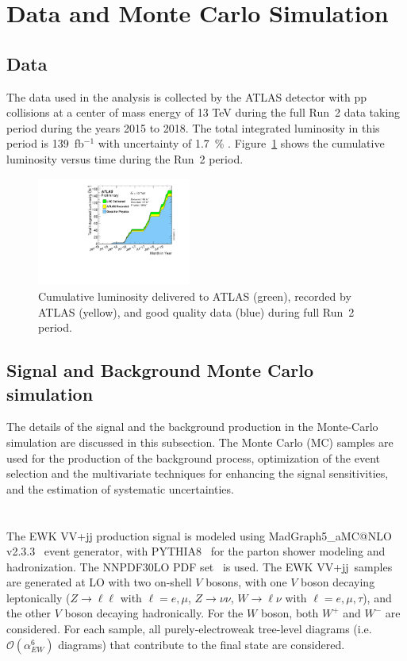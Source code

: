 \section{Data and Monte Carlo Simulation}
\subsection{Data}
The data used in the analysis is collected by the ATLAS detector with pp collisions at a center of mass energy of 13 TeV during the full Run~2 data taking period during the years 2015 to 2018. The total integrated luminosity in this period is 139~fb$^{-1}$ with uncertainty of 1.7~\% \cite{DAPR-2010-01}. Figure~\ref{fig:luminosity} shows the cumulative luminosity versus time during the Run~2 period.

\begin{figure}[H]
\begin{center}
 \includegraphics[width=0.45\textwidth,keepaspectratio]{figures/intlumivstimeRun2DQall.pdf}
\caption[f]{
Cumulative luminosity delivered to ATLAS (green), recorded by ATLAS (yellow), and good quality data (blue) during full Run~2 period.
}
\label{fig:luminosity}
\end{center}
\end{figure}

\subsection{Signal and Background Monte Carlo simulation}
\label{subsec:sigbgMC}
The details of the signal and the background production in the Monte-Carlo simulation are discussed in this subsection.
The Monte Carlo (MC) samples are used for the production of the background process, optimization of the event selection and the multivariate techniques for enhancing the signal sensitivities, and the estimation of systematic uncertainties.
\\ \\
\noindent\textbf{} \\ 
The EWK VV+jj production signal is modeled using MadGraph5\_aMC@NLO v2.3.3~\cite{Alwall:2014hca} event generator, with PYTHIA8~\cite{Sjostrand:2007gs} for the parton shower modeling and hadronization. The \textsc{NNPDF30LO} PDF set~\cite{Ball:2012cx} is used. 
The EWK VV+jj\ samples are generated at LO with two on-shell $V$ bosons, with one $V$ boson decaying leptonically
($Z\to \ell\ell$ with $\ell = e, \mu$, $Z\to \nu\nu$, $W\to \ell \nu$ with $\ell= e, \mu, \tau$),
and the other $V$ boson decaying hadronically. For the $W$ boson, both $W^{+}$ and $W^{-}$ are considered.
For each sample, all purely-electroweak tree-level diagrams (i.e. $\mathcal{O}(\alpha_{EW}^6)$ diagrams) that contribute to the final state are considered.


